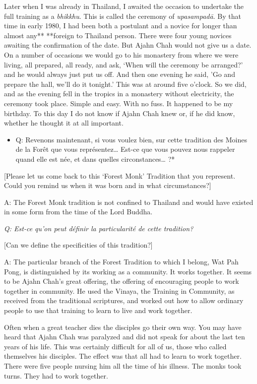Later when I was already in Thailand, I awaited the occasion to
undertake the full training as a \emph{bhikkhu}. This is called the
ceremony of \emph{upasampadā}. By that time in early 1980, I had been
both a postulant and a novice for longer than almost any** **foreign to
Thailand person. There were four young novices awaiting the confirmation
of the date. But Ajahn Chah would not give us a date. On a number of
occasions we would go to his monastery from where we were living, all
prepared, all ready, and ask, `When will the ceremony be arranged?' and
he would always just put us off. And then one evening he said, 'Go and
prepare the hall, we'll do it tonight.' This was at around five o'clock.
So we did, and as the evening fell in the tropics in a monastery without
electricity, the ceremony took place. Simple and easy. With no fuss. It
happened to be my birthday. To this day I do not know if Ajahn Chah knew
or, if he did know, whether he thought it at all important.

\begin{itemize}
\item
  Q: Revenons maintenant, si vous voulez bien, sur cette tradition des
  Moines de la Forêt que vous représentez\ldots{} Est-ce que vous pouvez
  nous rappeler quand elle est née, et dans quelles
  circonstances\ldots{} ?*
\end{itemize}

{[}Please let us come back to this `Forest Monk' Tradition that you
represent. Could you remind us when it was born and in what
circumstances?{]}

A: The Forest Monk tradition is not confined to Thailand and would have
existed in some form from the time of the Lord Buddha.

\emph{Q: Est-ce qu'on peut définir la particularité de cette tradition?}

{[}Can we define the specificities of this tradition?{]}

A: The particular branch of the Forest Tradition to which I belong, Wat
Pah Pong, is distinguished by its working as a community. It works
together. It seems to be Ajahn Chah's great offering, the offering of
encouraging people to work together in community. He used the Vinaya,
the Training in Community, as received from the traditional scriptures,
and worked out how to allow ordinary people to use that training to
learn to live and work together.

Often when a great teacher dies the disciples go their own way. You may
have heard that Ajahn Chah was paralyzed and did not speak for about the
last ten years of his life. This was certainly difficult for all of us,
those who called themselves his disciples. The effect was that all had
to learn to work together. There were five people nursing him all the
time of his illness. The monks took turns. They had to work together.

